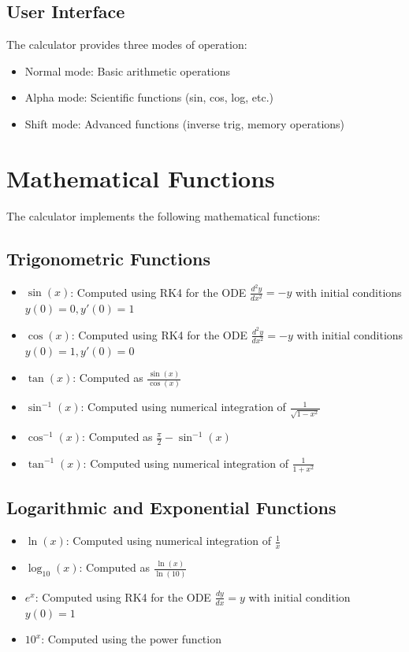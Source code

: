 \documentclass[12pt,a4paper]{article}
\begin{document}
\subsection{User Interface}
The calculator provides three modes of operation:
\begin{itemize}
    \item Normal mode: Basic arithmetic operations
    \item Alpha mode: Scientific functions (sin, cos, log, etc.)
    \item Shift mode: Advanced functions (inverse trig, memory operations)
\end{itemize}

\section{Mathematical Functions}
The calculator implements the following mathematical functions:

\subsection{Trigonometric Functions}
\begin{itemize}
    \item $\sin(x)$: Computed using RK4 for the ODE $\frac{d^2y}{dx^2} = -y$ with initial conditions $y(0) = 0, y'(0) = 1$
    \item $\cos(x)$: Computed using RK4 for the ODE $\frac{d^2y}{dx^2} = -y$ with initial conditions $y(0) = 1, y'(0) = 0$
    \item $\tan(x)$: Computed as $\frac{\sin(x)}{\cos(x)}$
    \item $\sin^{-1}(x)$: Computed using numerical integration of $\frac{1}{\sqrt{1-x^2}}$
    \item $\cos^{-1}(x)$: Computed as $\frac{\pi}{2} - \sin^{-1}(x)$
    \item $\tan^{-1}(x)$: Computed using numerical integration of $\frac{1}{1+x^2}$
\end{itemize}

\subsection{Logarithmic and Exponential Functions}
\begin{itemize}
    \item $\ln(x)$: Computed using numerical integration of $\frac{1}{x}$
    \item $\log_{10}(x)$: Computed as $\frac{\ln(x)}{\ln(10)}$
    \item $e^x$: Computed using RK4 for the ODE $\frac{dy}{dx} = y$ with initial condition $y(0) = 1$
    \item $10^x$: Computed using the power function
\end{itemize}
\end{document}
